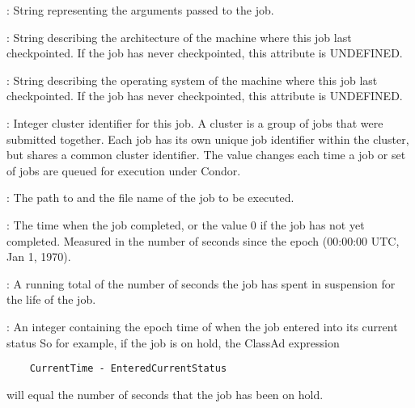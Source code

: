 \begin{description}


\item[\AdAttr{Args}] : String representing the arguments passed to the job.

\item[\AdAttr{CkptArch}] : String describing the architecture of the machine
where this job last checkpointed.  If the job has never checkpointed,
this attribute is UNDEFINED.

\item[\AdAttr{CkptOpSys}] : String describing the operating system of
the machine where this job last checkpointed.  If the job has never
checkpointed, this attribute is UNDEFINED.

\item[\AdAttr{ClusterId}] : Integer cluster identifier for this job.
A cluster is a group of jobs that were submitted together.  Each
job has its own unique job identifier within the cluster, but shares a
common cluster identifier.
The value changes each time a job or set of jobs are queued for
execution under Condor.

\item[\AdAttr{Cmd}] : The path to and the file name of the job to be executed.

\item[\AdAttr{CompletionDate}] : The time when the job completed,
or the value 0 if the job has not yet completed.
Measured in the
number of seconds since the epoch (00:00:00 UTC, Jan 1, 1970).

\item[\AdAttr{CumulativeSuspensionTime}] : A running total of the number of
seconds the job has spent in suspension for the life of the job.

\item[\AdAttr{EnteredCurrentStatus}] : An integer containing the
epoch time of when the job entered into its current status
So for example, if the job is on hold, the ClassAd expression
\begin{verbatim}
    CurrentTime - EnteredCurrentStatus
\end{verbatim}
will equal the number of seconds that the job has been on hold.


\end{description}
